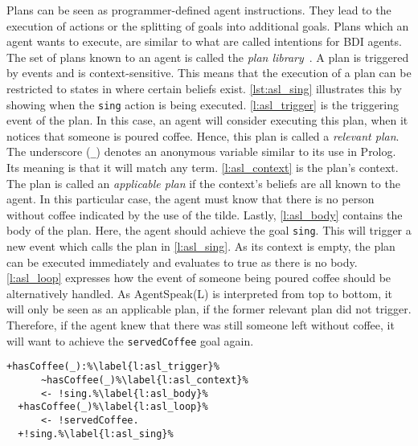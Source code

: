 Plans can be seen as programmer-defined agent instructions.
They lead to the execution of actions or the splitting of goals into additional goals.
Plans which an agent wants to execute, are similar to what are called intentions for BDI agents.
The set of plans known to an agent is called the \emph{plan library}~\cite{bordini_jason_2005}.
A plan is triggered by events and is context-sensitive.
This means that the execution of a plan can be restricted to states in where certain beliefs exist.
\autoref{lst:asl_sing} illustrates this by showing when the \texttt{sing} action is being executed.
\autoref{l:asl_trigger} is the triggering event of the plan.
In this case, an agent will consider executing this plan, when it notices that someone is poured coffee.
Hence, this plan is called a \emph{relevant plan}.
The underscore (\texttt{\_}) denotes an anonymous variable similar to its use in Prolog.
Its meaning is that it will match any term.
\autoref{l:asl_context} is the plan's context.
The plan is called an \emph{applicable plan} if the context's beliefs are all known to the agent.
In this particular case, the agent must know that there is no person without coffee indicated by the use of the tilde.
Lastly, \autoref{l:asl_body} contains the body of the plan.
Here, the agent should achieve the goal \texttt{sing}.
This will trigger a new event which calls the plan in \autoref{l:asl_sing}.
As its context is empty, the plan can be executed immediately and evaluates to true as there is no body.
\autoref{l:asl_loop} expresses how the event of someone being poured coffee should be alternatively handled.
As AgentSpeak(L) is interpreted from top to bottom, it will only be seen as an applicable plan, if the former relevant plan did not trigger.
Therefore, if the agent knew that there was still someone left without coffee, it will want to achieve the \texttt{servedCoffee} goal again.
\begin{lstlisting}[firstnumber=4, caption={Events for handling someone being poured a coffee as well as the \texttt{sing} plan.}, label=lst:asl_sing]
  +hasCoffee(_):%\label{l:asl_trigger}%
      ~hasCoffee(_)%\label{l:asl_context}%
      <- !sing.%\label{l:asl_body}%
  +hasCoffee(_)%\label{l:asl_loop}%
      <- !servedCoffee.
  +!sing.%\label{l:asl_sing}%
\end{lstlisting}
